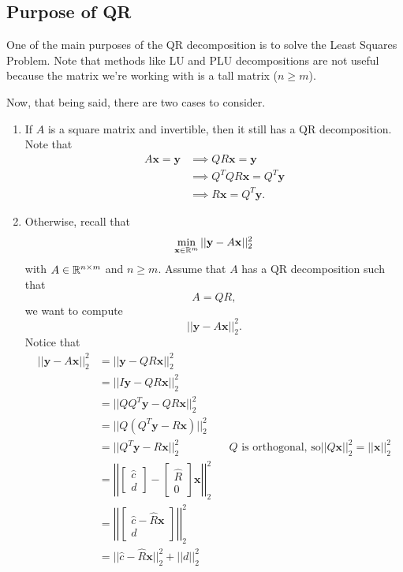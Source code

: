 \documentclass[letterpaper]{article}
\newcommand{\0}{\mathbf{0}}
\newcommand{\y}{\mathbf{y}}
\newcommand{\x}{\mathbf{x}}
\begin{document}
\subsection{Purpose of QR}
One of the main purposes of the QR decomposition is to solve the Least Squares Problem. Note that methods like LU and PLU decompositions are not useful because the matrix we're working with is a tall matrix ($n \geq m$). 

\bigskip 

Now, that being said, there are two cases to consider. 
\begin{enumerate}
    \item If $A$ is a square matrix and invertible, then it still has a QR decomposition. Note that 
    \begin{equation*}
        \begin{aligned}
            A\x = \y &\implies QR\x = \y \\ 
                &\implies Q^T Q R \x = Q^T \y \\ 
                &\implies R\x = Q^T \y. 
        \end{aligned}
    \end{equation*}

    \item Otherwise, recall that \[\min_{\x \in \R^m} ||\y - A\x||_{2}^{2}\] with $A \in \mathbb{R}^{n \times m}$ and $n \geq m$. Assume that $A$ has a QR decomposition such that \[A = QR,\] we want to compute \[||\y - A\x||_{2}^{2}.\] Notice that
    \begin{equation*}
        \begin{aligned}
            ||\y - A\x||_2^2 &= ||\y - QR\x||_2^2 \\ 
                &= ||I\y - QR\x||_2^2 \\ 
                &= ||QQ^T \y - QR\x||_2^2 \\ 
                &= ||Q(Q^T \y - R\x)||_2^2 \\ 
                &= ||Q^T \y - R\x||_2^2 && Q \text{ is orthogonal, so} ||Q\x||_2^2 = ||\x||_2^2 \\ 
                &= \left|\left| \begin{bmatrix}
                    \hat{c} \\ d
                \end{bmatrix} - \begin{bmatrix}
                    \hat{R} \\ 0
                \end{bmatrix} \x \right|\right|_2^2 \\ 
                &= \left|\left| \begin{bmatrix}
                    \hat{c} - \hat{R}\x \\ 
                    d 
                \end{bmatrix} \right|\right|_2^2 \\ 
                &= ||\hat{c} - \hat{R}\x||_2^2 + ||d||_2^2
        \end{aligned}
    \end{equation*}


\end{enumerate}
\end{document}
